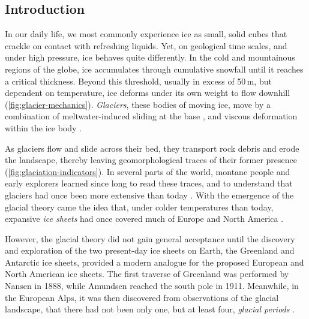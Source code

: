 \documentclass[a4paper]{kappa}
\begin{document}
\begin{multicols}{2}  %

\section{Introduction}

In our daily life, we most commonly experience ice as small, solid cubes
that crackle on contact with refreshing liquids. Yet, on geological
time scales, and under high pressure, ice behaves quite differently.
In the cold and mountainous regions of the globe, ice accumulates through
cumulative snowfall until it reaches a critical thickness. Beyond this
threshold, usually in excess of 50\,m, but dependent on temperature, ice
deforms under its own weight to flow downhill (\cref{fig:glacier-mechanics}).
\emph{Glaciers}, these bodies of moving ice, move by a combination of
meltwater-induced sliding at the base \citep[\S532]{Saussure.1786},
and viscous deformation within the
ice body \citep{Forbes.1846b}.

As glaciers flow and slide across their bed, they transport
rock debris and erode the landscape, thereby leaving geomorphological traces of
their former presence (\cref{fig:glaciation-indicators}). In several parts of
the world, montane people
and early explorers learned since long to read these traces, and to
understand that glaciers had once been more extensive than today
\citep[e.g.,][p.~21]{Windham.Martel.1744}. With the emergence of the glacial
theory came the idea that, under colder temperatures
than today, expansive \emph{ice sheets} had once covered much of Europe and
North America \citep{Agassiz.1840}.

However, the glacial theory did not gain general acceptance until the
discovery and exploration
of the two present-day ice sheets on Earth, the Greenland and
Antarctic ice sheets, provided a modern analogue for the proposed European and
North American ice sheets. The first traverse of Greenland was performed by
Nansen in 1888, while Amundsen reached the south pole in 1911. Meanwhile, in
the European Alps, it was then discovered from observations of the glacial
landscape, that there had not been only one, but at least four, \emph{glacial
periods} \citep{Penck.Bruckner.1909}.

\end{multicols}
\twocolumn
\end{document}
